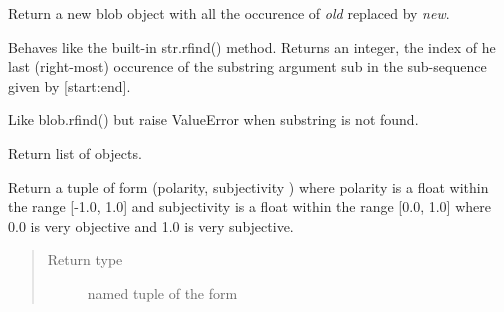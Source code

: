 \documentclass[letterpaper,10pt,english]{sphinxmanual}
\begin{document}
\begin{fulllineitems}

\begin{fulllineitems}
\label{api_reference:textblob_de.blob.TextBlobDE.replace}
Return a new blob object with all the occurence of \emph{old} replaced
by \emph{new}.

\end{fulllineitems}


\begin{fulllineitems}
\label{api_reference:textblob_de.blob.TextBlobDE.rfind}
Behaves like the built-in str.rfind() method. Returns an integer,
the index of he last (right-most) occurence of the substring argument
sub in the sub-sequence given by {[}start:end{]}.

\end{fulllineitems}


\begin{fulllineitems}
\label{api_reference:textblob_de.blob.TextBlobDE.rindex}
Like blob.rfind() but raise ValueError when substring is not
found.

\end{fulllineitems}


\begin{fulllineitems}
\label{api_reference:textblob_de.blob.TextBlobDE.sentences}
Return list of {\hyperref[api_reference:textblob_de.blob.Sentence]{}} objects.

\end{fulllineitems}


\begin{fulllineitems}
\label{api_reference:textblob_de.blob.TextBlobDE.sentiment}
Return a tuple of form (polarity, subjectivity ) where polarity
is a float within the range {[}-1.0, 1.0{]} and subjectivity is a float
within the range {[}0.0, 1.0{]} where 0.0 is very objective and 1.0 is
very subjective.
\begin{quote}\begin{description}
\item[{Return type}] \leavevmode
named tuple of the form 


\end{description}
\end{quote}
\end{fulllineitems}
\end{fulllineitems}
\end{document}
